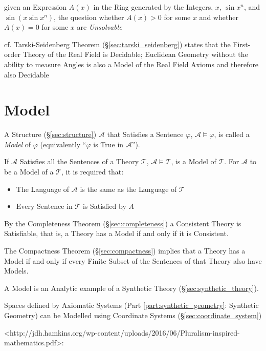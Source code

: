 given an Expression $A(x)$ in the Ring generated by the Integers, $x$, $\sin
x^n$, and $\sin(x \sin x^n)$, the question whether $A(x) > 0$ for some $x$ and
whether $A(x) = 0$ for some $x$ are \emph{Unsolvable}

cf. Tarski-Seidenberg Theorem (\S\ref{sec:tarski_seidenberg}) states that the
First-order Theory of the Real Field is Decidable; Euclidean Geometry without
the ability to measure Angles is also a Model of the Real Field Axioms and
therefore also Decidable



\section{Model}\label{sec:model}

A Structure (\S\ref{sec:structure}) $\mathcal{A}$ that Satisfies a
Sentence $\varphi$, $\mathcal{A} \models \varphi$, is called a
\emph{Model} of $\varphi$ (equivalently ``$\varphi$ is True in
$\mathcal{A}$'').

If $\mathcal{A}$ Satisfies all the Sentences of a Theory
$\mathcal{T}$, $\mathcal{A} \models \mathcal{T}$, is a Model of
$\mathcal{T}$. For $\mathcal{A}$ to be a Model of a $\mathcal{T}$, it
is required that:
\begin{itemize}
  \item The Language of $\mathcal{A}$ is the same as the Language of
    $\mathcal{T}$
  \item Every Sentence in $\mathcal{T}$ is Satisfied by $A$
\end{itemize}
By the Completeness Theorem (\S\ref{sec:completeness}) a Consistent
Theory is Satisfiable, that is, a Theory has a Model if and only if it
is Consistent.

The Compactness Theorem (\S\ref{sec:compactness}) implies that a
Theory has a Model if and only if every Finite Subset of the Sentences
of that Theory also have Models.

A Model is an Analytic example of a Synthetic Theory
(\S\ref{sec:synthetic_theory}). \cite{shulman15}

Spaces defined by Axiomatic Systems (Part \ref{part:synthetic_geometry}:
Synthetic Geometry) can be Modelled using Coordinate Systems
(\S\ref{sec:coordinate_system})


<http://jdh.hamkins.org/wp-content/uploads/2016/06/Pluralism-inspired-mathematics.pdf>:

